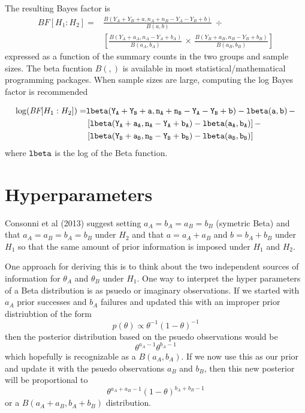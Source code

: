 \documentclass[11pt]{article}
\def\lbeta{\tt{lbeta}}
\def\BF{\textit{BF}}
\begin{document}
The resulting Bayes factor is 
\begin{align*}
\BF[H_1: H_2] =  & \frac{B(Y_A + Y_B + a, n_A + n_B - Y_A - Y_B + b)}{B(a,b)} \, \div \\ & \left[ \frac{B(Y_A + a_A, n_A - Y_A  + b_A)}{B(a_A,b_A)} \, \times \,
\frac{B(Y_B + a_B, n_B - Y_B  + b_B)} {B(a_B,b_B)} \right]
\end{align*}
expressed as a function of the summary counts in the two groups and sample sizes.  The beta fucntion  $B(,)$ is available in most statistical/mathematical programming packages.   When sample sizes are large, computing the log Bayes factor is recommended

\begin{align*}
\log(\BF[H_1: H_2]) =  & \lbeta(Y_A + Y_B + a, n_A + n_B - Y_A - Y_B + b) - \lbeta(a,b) \, - \\
 & \left[ \lbeta(Y_A + a_A, n_A - Y_A  + b_A) - \lbeta(a_A,b_A) \right] - \\
 & \left[\lbeta(Y_B + a_B, n_B - Y_B  + b_B) - \lbeta(a_B,b_B) \right]
\end{align*} 
where $\lbeta$ is the log of the Beta function.

\section*{Hyperparameters}

Consonni et al (2013) suggest setting $a_{A} = b_{A} = a_B = b_B$ (symetric Beta) and that $a_A = a_B = b_A = b_B$ under $H_2$ and that $a = a_A + a_B$ and $b = b_A + b_B$ under $H_1$ so that the same amount of prior information is imposed under $H_1$ and $H_2$.  

One approach for deriving this is to think about the two independent sources of information for $\theta_A$ and $\theta_B$ under $H_1$. One way to interpret the hyper parameters of a Beta distribution is as psuedo or imaginary observations. 
If we started with $a_A$ prior successes and $b_A$ failures and updated this with an improper prior distriubtion of the form 
$$p(\theta) \propto \theta^{-1} (1 - \theta)^{-1}$$ then the 
posterior distribution based on the psuedo observations would be
$$\theta^{a_A - 1} \theta^{b_A -1}
$$
which hopefully is recognizable as a $B(a_A, b_A)$.   If we now use this as our prior and update it with the psuedo observations $a_B$ and $b_B$, then this new posterior will be proportional to 
$$
\theta^{a_A + a_B -1} (1 - \theta)^{b_A + b_B -1}
$$
or a $B(a_A + a_B, b_A + b_B)$ distribution.
\end{document}
